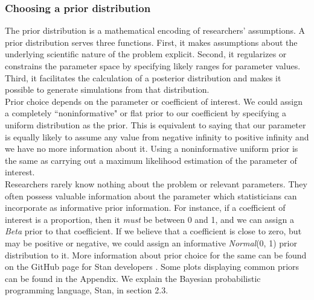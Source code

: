 \documentclass{article}
\begin{document}
\subsubsection{Choosing a prior distribution}
The prior distribution is a mathematical encoding of researchers' assumptions. A prior distribution serves three functions. First, it makes assumptions about the underlying scientific nature of the problem explicit. Second, it regularizes or constrains the parameter space by specifying likely ranges for parameter values. Third, it facilitates the calculation of a posterior distribution and makes it possible to generate simulations from that distribution. \\
Prior choice depends on the parameter or coefficient of interest.  We could assign a completely ``noninformative" or flat prior to our coefficient by specifying a uniform distribution as the prior. This is equivalent to saying that our parameter is equally likely to assume any value from negative infinity to positive infinity and we have no more information about it. Using a noninformative uniform prior is the same as carrying out a maximum likelihood estimation of the parameter of interest. \\
Researchers rarely know nothing about the problem or relevant parameters. They often possess valuable information about the parameter which statisticians can incorporate as informative prior information. For instance, if a coefficient of interest is a proportion, then it \emph{must} be between 0 and 1, and we can assign a \emph{Beta} prior to that coefficient.  If we believe that a coefficient is close to zero, but may be positive or negative, we could assign an informative \emph{Normal}(0, 1) prior distribution to it.  More information about prior choice for the same can be found on the GitHub page for Stan developers \cite{prior-choice}. Some plots displaying common priors can be found in the Appendix. We explain the Bayesian probabilistic programming language, Stan, in section 2.3.\\
\end{document}
